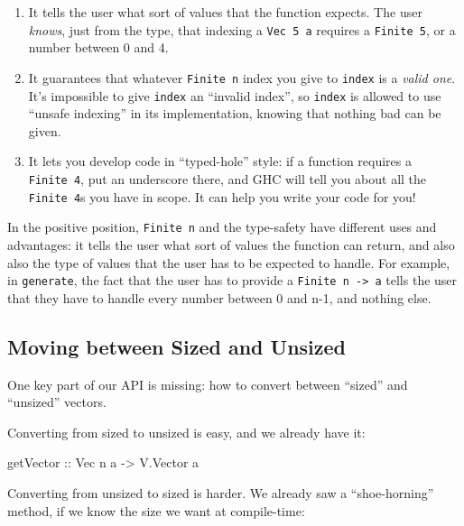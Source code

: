 \documentclass[]{article}
\newenvironment{Shaded}{}{}
\newcommand{\DataTypeTok}[1]{\textcolor[rgb]{0.56,0.13,0.00}{#1}}
\newcommand{\NormalTok}[1]{#1}
\newcommand{\OtherTok}[1]{\textcolor[rgb]{0.00,0.44,0.13}{#1}}
\begin{document}
\begin{enumerate}
\def\labelenumi{\arabic{enumi}.}
\tightlist
\item
  It tells the user what sort of values that the function expects. The user
  \emph{knows}, just from the type, that indexing a \texttt{Vec\ 5\ a} requires
  a \texttt{Finite\ 5}, or a number between 0 and 4.
\item
  It guarantees that whatever \texttt{Finite\ n} index you give to
  \texttt{index} is a \emph{valid one}. It's impossible to give \texttt{index}
  an ``invalid index'', so \texttt{index} is allowed to use ``unsafe indexing''
  in its implementation, knowing that nothing bad can be given.
\item
  It lets you develop code in ``typed-hole'' style: if a function requires a
  \texttt{Finite\ 4}, put an underscore there, and GHC will tell you about all
  the \texttt{Finite\ 4}s you have in scope. It can help you write your code for
  you!
\end{enumerate}

In the positive position, \texttt{Finite\ n} and the type-safety have different
uses and advantages: it tells the user what sort of values the function can
return, and also also the type of values that the user has to be expected to
handle. For example, in \texttt{generate}, the fact that the user has to provide
a \texttt{Finite\ n\ -\textgreater{}\ a} tells the user that they have to handle
every number between 0 and n-1, and nothing else.

\hypertarget{moving-between-sized-and-unsized}{%
\subsection{Moving between Sized and
Unsized}\label{moving-between-sized-and-unsized}}

One key part of our API is missing: how to convert between ``sized'' and
``unsized'' vectors.

Converting from sized to unsized is easy, and we already have it:

\begin{Shaded}
\begin{Highlighting}[]
\OtherTok{getVector ::} \DataTypeTok{Vec}\NormalTok{ n a }\OtherTok{{-}>} \DataTypeTok{V.Vector}\NormalTok{ a}
\end{Highlighting}
\end{Shaded}

Converting from unsized to sized is harder. We already saw a ``shoe-horning''
method, if we know the size we want at compile-time:
\end{document}
